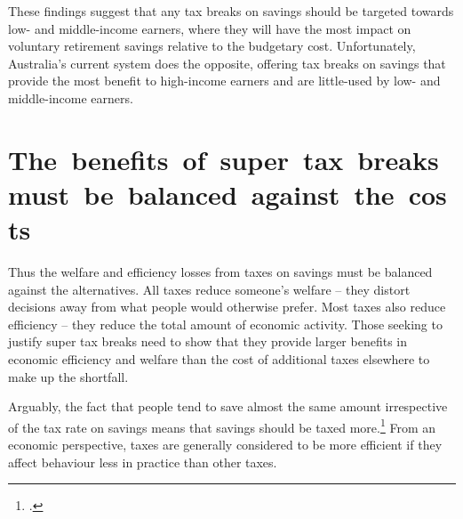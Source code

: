 These findings suggest that any tax breaks on savings should be targeted towards low- and middle-income earners, where they will have the most impact on voluntary retirement savings relative to the budgetary cost. Unfortunately, Australia’s current system does the opposite, offering tax breaks on savings that provide the most benefit to high-income earners and are little-used by low- and middle-income earners. 

\section{\mbox{The benefits of super tax breaks must be balanced against the costs}\label{sec:SUPER-2-7}}
Thus the welfare and efficiency losses from taxes on savings must be balanced against the alternatives. All taxes reduce someone’s welfare – they distort decisions away from what people would otherwise prefer. Most taxes also reduce efficiency – they reduce the total amount of economic activity. Those seeking to justify super tax breaks need to show that they provide larger benefits in economic efficiency and welfare than the cost of additional taxes elsewhere to make up the shortfall.

Arguably, the fact that people tend to save almost the same amount irrespective of the tax rate on savings means that savings should be taxed more.\footcite[][21]{Ingles2015}  From an economic perspective, taxes are generally considered to be more efficient if they affect behaviour less in practice than other taxes.

